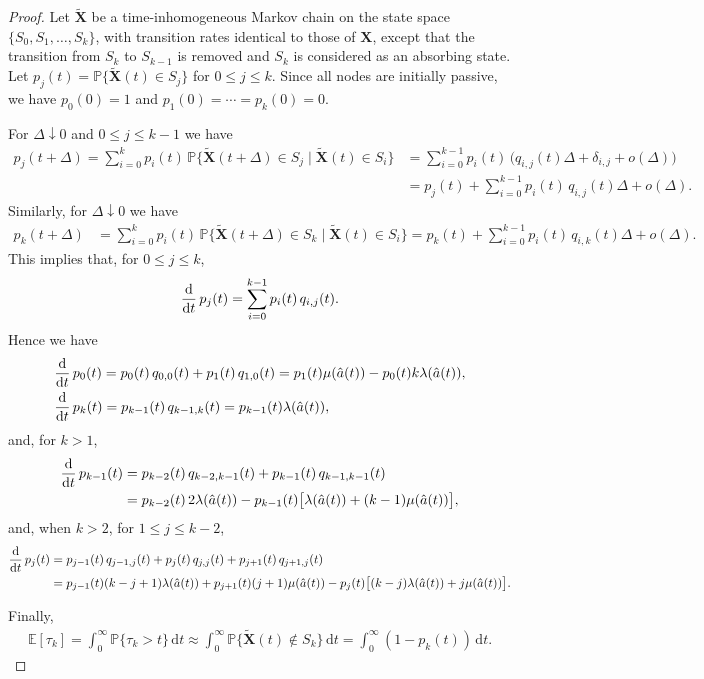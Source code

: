 \documentclass[11pt]{article}
\numberwithin{equation}{section}
\newcommand{\ddd}{{\rm d}}
\newcommand{\X}{\mathbf{X}}
\renewcommand{\P}{\mathbb{P}}
\newcommand{\E}{\mathbb{E}}
\newcommand{\dd}{\mathrm{d}}
\begin{document}
\begin{proof}
Let $\tilde{\mathbf{X}}$ be a time-inhomogeneous Markov chain on the state space $\{S_0, S_1, \ldots, S_k\}$, with transition rates identical to those of $\mathbf{X}$, except that the transition from $S_k$ to $S_{k-1}$ is removed and $S_k$ is considered as an absorbing state. Let $p_{j}(t)=\P\{\tilde{\X}(t)\in S_{j}\}$ for $0\leq j\leq k$. Since all nodes are initially passive, we have $p_{0}(0)=1$ and $p_{1}(0)=\cdots =p_{k}(0)=0$. 

For $\Delta \downarrow 0$ and $0\leq j\leq k-1$ we have
\begin{align*}
p_{j}(t+\Delta) = \sum_{i=0}^{k}p_{i}(t)\, \P\big\{\tilde{\X} (t+\Delta)\in S_{j}\mid \tilde{\X} (t)\in S_{i}\big\}&
= \sum_{i=0}^{k-1}p_{i}(t)\, \big( q_{i,j}(t)\Delta + \delta_{i,j} +o(\Delta)\big)\\&
=p_{j}(t)+\sum_{i=0}^{k-1}p_{i}(t)\, q_{i,j}(t)\Delta +o(\Delta).
\end{align*}
Similarly, for $\Delta \downarrow 0$ we have
\begin{align*}
p_{k}(t+\Delta) &= \sum_{i=0}^{k}p_{i}(t)\, \P\big\{\tilde{\X} (t+\Delta)\in S_{k}\mid \tilde{\X} (t)\in S_{i}\big\}
= p_{k}(t)+ \sum_{i=0}^{k-1}p_{i}(t)\, q_{i,k}(t)\Delta +o(\Delta).
\end{align*}
This implies that, for $0\leq j\leq k$,
\begin{align*}
\frac{\ddd}{\ddd t}\,p_{j}(t)=\sum_{i=0}^{k-1}p_{i}(t)\, q_{i,j}(t).
\end{align*}
Hence we have
\begin{align*}
&\frac{\ddd}{\ddd t}\,p_{0}(t)=p_{0}(t)\, q_{0,0}(t)+p_{1}(t)\, q_{1,0}(t)=p_{1}(t)\mu(\hat{a}(t))-p_{0}(t)k\lambda(\hat{a}(t)),
\\&\frac{\ddd}{\ddd t}\,p_{k}(t)=p_{k-1}(t)\, q_{k-1,k}(t)=p_{k-1}(t) \lambda(\hat{a}(t)),
\end{align*}
and, for $k>1$,
\begin{align*}
\frac{\ddd}{\ddd t}\,p_{k-1}(t)&=p_{k-2}(t)\, q_{k-2,k-1}(t)+p_{k-1}(t)\, q_{k-1,k-1}(t)\\&
=p_{k-2}(t)\, 2\lambda(\hat{a}(t))-p_{k-1}(t)\big[\lambda(\hat{a}(t)) + (k-1)\mu(\hat{a}(t))\big],
\end{align*}
and, when $k>2$, for $1\leq j\leq k-2$,
\begin{align*}
\frac{\ddd}{\ddd t}\,p_{j}(t)&=p_{j-1}(t)\, q_{j-1,j}(t)+p_{j}(t)\, q_{j,j}(t)+p_{j+1}(t)\, q_{j+1,j}(t)\\&
=p_{j-1}(t)(k-j+1) \lambda(\hat{a}(t))+p_{j+1}(t) (j+1)\mu(\hat{a}(t))-p_{j}(t)\big[(k - j)\lambda(\hat{a}(t)) + j\mu(\hat{a}(t))\big] .
\end{align*}

Finally, 
\begin{align*}
\E[\tau_{k}]=\int_{0}^{\infty}\P\{\tau_{k}>t\}\, \dd t\approx\int_{0}^{\infty}\P\{\tilde{\X}(t)\notin S_{k}\}\, \dd t=\int_{0}^{\infty}(1-p_{k}(t))\, \dd t.
\end{align*}
\end{proof}
\end{document}
